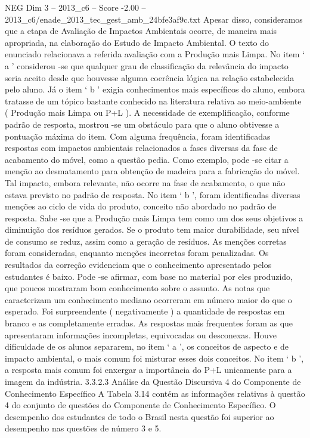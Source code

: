 \begin{textsample}{NEG Dim 3 – 2013\_c6 – Score -2.00 – 2013\_c6/enade\_2013\_tec\_gest\_amb\_24bfe3af9c.txt}
Apesar disso, consideramos que a etapa de Avaliação de Impactos Ambientais ocorre, de maneira mais apropriada, na elaboração do Estudo de Impacto Ambiental.
O texto do enunciado relacionava a referida avaliação com a Produção mais Limpa.
No item ‘ a ’ considerou -se que qualquer grau de classificação da relevância do impacto seria aceito desde que houvesse alguma coerência lógica na relação estabelecida pelo aluno.
Já o item ‘ b ’ exigia conhecimentos mais específicos do aluno, embora tratasse de um tópico bastante conhecido na literatura relativa ao meio-ambiente ( Produção mais Limpa ou P+L ).
A necessidade de exemplificação, conforme padrão de resposta, mostrou -se um obstáculo para que o aluno obtivesse a pontuação máxima do item.
Com alguma frequência, foram identificadas respostas com impactos ambientais relacionados a fases diversas da fase de acabamento do móvel, como a questão pedia.
Como exemplo, pode -se citar a menção ao desmatamento para obtenção de madeira para a fabricação do móvel.
Tal impacto, embora relevante, não ocorre na fase de acabamento, o que não estava previsto no padrão de resposta.
No item ‘ b ’, foram identificadas diversas menções ao ciclo de vida do produto, conceito não abordado no padrão de resposta.
Sabe -se que a Produção mais Limpa tem como um dos seus objetivos a diminuição dos resíduos gerados.
Se o produto tem maior durabilidade, seu nível de consumo se reduz, assim como a geração de resíduos.
As menções corretas foram consideradas, enquanto menções incorretas foram penalizadas.
Os resultados da correção evidenciam que o conhecimento apresentado pelos estudantes é baixo.
Pode -se afirmar, com base no material por eles produzido, que poucos mostraram bom conhecimento sobre o assunto.
As notas que caracterizam um conhecimento mediano ocorreram em número maior do que o esperado.
Foi surpreendente ( negativamente ) a quantidade de respostas em branco e as completamente erradas.
As respostas mais frequentes foram as que apresentaram informações incompletas, equivocadas ou desconexas.
Houve dificuldade de os alunos separarem, no item ‘ a ’, os conceitos de aspecto e de impacto ambiental, o mais comum foi misturar esses dois conceitos.
No item ‘ b ’, a resposta mais comum foi enxergar a importância do P+L unicamente para a imagem da indústria. 3.3.2.3 Análise da Questão Discursiva 4 do Componente de Conhecimento Específico A Tabela 3.14 contém as informações relativas à questão 4 do conjunto de questões do Componente de Conhecimento Específico.
O desempenho dos estudantes de todo o Brasil nesta questão foi superior ao desempenho nas questões de número 3 e 5.

\end{textsample}
